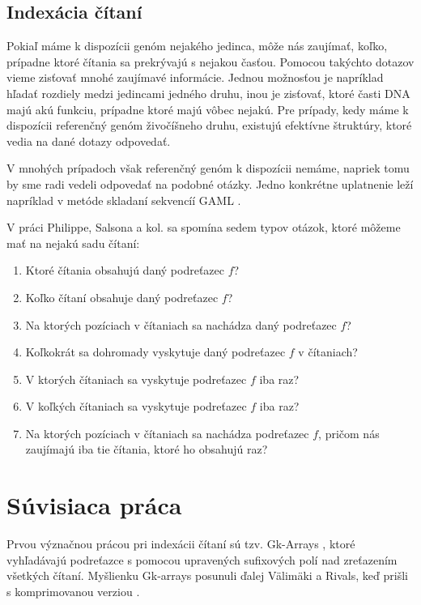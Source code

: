 \subsection{Indexácia čítaní}

Pokiaľ máme k dispozícii genóm nejakého jedinca, môže nás zaujímať, koľko, prípadne
ktoré čítania sa prekrývajú s nejakou časťou. Pomocou takýchto dotazov vieme zisťovať
mnohé zaujímavé informácie. Jednou možnosťou je napríklad hľadať rozdiely medzi
jedincami jedného druhu, inou je zisťovať, ktoré časti DNA majú akú funkciu, prípadne
ktoré majú vôbec nejakú. Pre prípady, kedy máme k dispozícii referenčný genóm živočíšneho
druhu, existujú efektívne štruktúry, ktoré vedia na dané dotazy odpovedať.

V mnohých prípadoch však referenčný genóm k dispozícii nemáme, napriek tomu by sme
radi vedeli odpovedať na podobné otázky. Jedno konkrétne uplatnenie leží napríklad
v metóde skladaní sekvencíí GAML \cite{gaml}.

V práci Philippe, Salsona a kol. \cite{gk_arrays} sa spomína sedem typov otázok,
ktoré môžeme mať na nejakú sadu čítaní:

\begin{enumerate}
    \item Ktoré čítania obsahujú daný podreťazec $f$?
    \item Koľko čítaní obsahuje daný podreťazec $f$?
    \item Na ktorých pozíciach v čítaniach sa nachádza daný podreťazec $f$?
    \item Koľkokrát sa dohromady vyskytuje daný podreťazec $f$ v čítaniach?
    \item V ktorých čítaniach sa vyskytuje podreťazec $f$ iba raz?
    \item V koľkých čítaniach sa vyskytuje podreťazec $f$ iba raz?
    \item Na ktorých pozíciach v čítaniach sa nachádza podreťazec $f$, pričom nás
    zaujímajú iba tie čítania, ktoré ho obsahujú raz?
\end{enumerate}

\section{Súvisiaca práca}

Prvou význačnou prácou pri indexácii čítaní sú tzv. Gk-Arrays \cite{gk_arrays}, ktoré
vyhľadávajú podreťazce s pomocou upravených sufixových polí nad zreťazením všetkých
čítaní.
Myšlienku Gk-arrays posunuli ďalej Välimäki a Rivals, keď prišli s komprimovanou
verziou \cite{comp_gk_arrays}.

